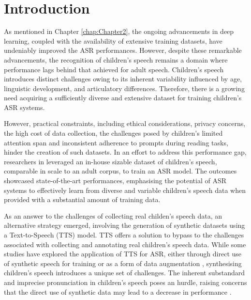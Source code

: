 \label{chap:6}
\cleardoublepage

\section{Introduction}
As mentioned in Chapter \ref{chap:Chapter2}, the ongoing advancements in deep learning, coupled with the availability of extensive training datasets, have undeniably improved the ASR performances. However, despite these remarkable advancements, the recognition of children's speech remains a domain where performance lags behind that achieved for adult speech. Children's speech introduces distinct challenges owing to its inherent variability influenced by age, linguistic development, and articulatory differences. Therefore, there is a growing need acquiring a sufficiently diverse and extensive dataset for training children's ASR systems. 

However, practical constraints, including ethical considerations, privacy concerns, the high cost of data collection, the challenges posed by children's limited attention span and inconsistent adherence to prompts during reading tasks, hinder the creation of such datasets. In an effort to address this performance gap, researchers in \cite{asr-google} leveraged an in-house sizable dataset of children's speech, comparable in scale to an adult corpus, to train an ASR model. The outcomes showcased state-of-the-art performances, emphasising the potential of ASR systems to effectively learn from diverse and variable children's speech data when provided with a substantial amount of training data.

As an answer to the challenges of collecting real childen's speech data, an alternative strategy emerged, involving the generation of synthetic datasets using a Text-to-Speech (TTS) model. TTS offers a solution to bypass to the challenges associated with collecting and annotating real children's speech data. While some studies have explored the application of TTS for ASR, either through direct use of synthetic speech for training or as a form of data augmentation \cite{laptev2020you,fazel21_interspeech}, synthesising children's speech introduces a unique set of challenges. The inherent substandard and imprecise pronunciation in children's speech \cite{wang2021towards} poses an hurdle, raising concerns that the direct use of synthetic data may lead to a decrease in performance \cite{wang2021towards, hu2022synt++}.

